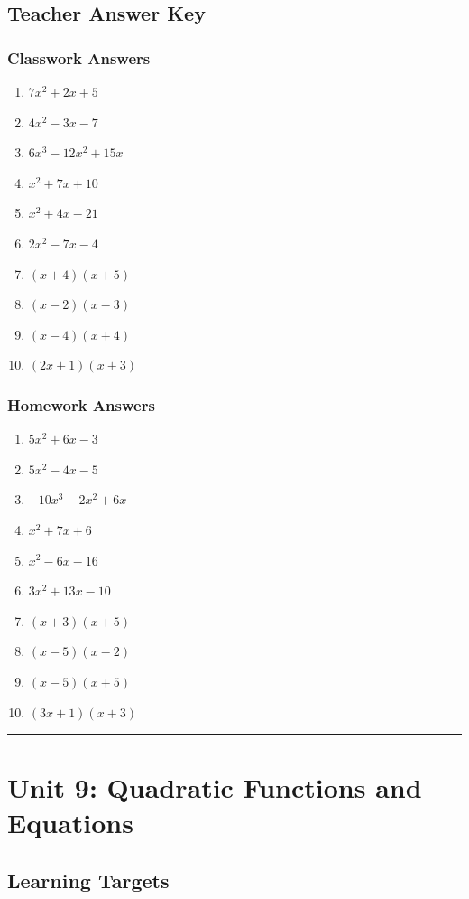 \documentclass[11pt]{book}
\begin{document}
\section{Teacher Answer Key}

\subsection{Classwork Answers}

\begin{enumerate}
\item \(7x^2+2x+5\)
\item \(4x^2-3x-7\)
\item \(6x^3-12x^2+15x\)
\item \(x^2+7x+10\)
\item \(x^2+4x-21\)
\item \(2x^2-7x-4\)
\item \((x+4)(x+5)\)
\item \((x-2)(x-3)\)
\item \((x-4)(x+4)\)
\item \((2x+1)(x+3)\)
\end{enumerate}

\subsection{Homework Answers}

\begin{enumerate}
\item \(5x^2+6x-3\)
\item \(5x^2-4x-5\)
\item \(-10x^3-2x^2+6x\)
\item \(x^2+7x+6\)
\item \(x^2-6x-16\)
\item \(3x^2+13x-10\)
\item \((x+3)(x+5)\)
\item \((x-5)(x-2)\)
\item \((x-5)(x+5)\)
\item \((3x+1)(x+3)\)
\end{enumerate}

\bigskip\hrule\bigskip

\chapter{Unit 9: Quadratic Functions and Equations}

\section{Learning Targets}
\end{document}
